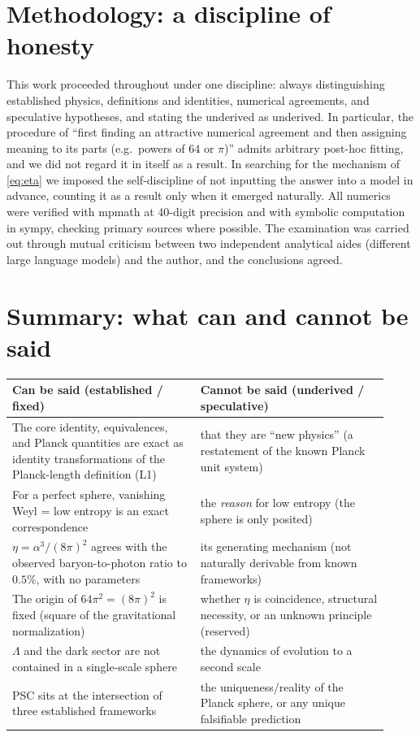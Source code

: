 \documentclass[11pt,a4paper]{article}
\begin{document}
\section{Methodology: a discipline of honesty}
This work proceeded throughout under one discipline: always distinguishing established physics, definitions and identities, numerical agreements, and speculative hypotheses, and stating the underived as underived. In particular, the procedure of ``first finding an attractive numerical agreement and then assigning meaning to its parts (e.g.\ powers of $64$ or $\pi$)'' admits arbitrary post-hoc fitting, and we did not regard it in itself as a result. In searching for the mechanism of \eqref{eq:eta} we imposed the self-discipline of not inputting the answer into a model in advance, counting it as a result only when it emerged naturally. All numerics were verified with mpmath at 40-digit precision and with symbolic computation in sympy, checking primary sources where possible. The examination was carried out through mutual criticism between two independent analytical aides (different large language models) and the author, and the conclusions agreed.

\section{Summary: what can and cannot be said}
\begin{center}\small
\begin{tabular}{@{}p{0.46\linewidth}p{0.46\linewidth}@{}}
\toprule
\textbf{Can be said (established / fixed)} & \textbf{Cannot be said (underived / speculative)} \\
\midrule
The core identity, equivalences, and Planck quantities are exact as identity transformations of the Planck-length definition (L1) & that they are ``new physics'' (a restatement of the known Planck unit system) \\
For a perfect sphere, vanishing Weyl = low entropy is an exact correspondence & the \emph{reason} for low entropy (the sphere is only posited) \\
$\eta=\alpha^3/(8\pi)^2$ agrees with the observed baryon-to-photon ratio to $0.5\%$, with no parameters & its generating mechanism (not naturally derivable from known frameworks) \\
The origin of $64\pi^2=(8\pi)^2$ is fixed (square of the gravitational normalization) & whether $\eta$ is coincidence, structural necessity, or an unknown principle (reserved) \\
$\Lambda$ and the dark sector are not contained in a single-scale sphere & the dynamics of evolution to a second scale \\
PSC sits at the intersection of three established frameworks & the uniqueness/reality of the Planck sphere, or any unique falsifiable prediction \\
\bottomrule
\end{tabular}
\end{center}
\end{document}
